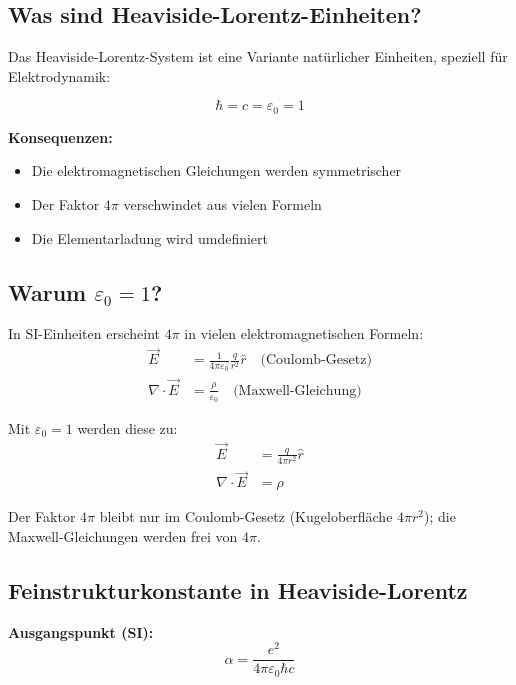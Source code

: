 	\subsection{Was sind Heaviside-Lorentz-Einheiten?}
	
	Das Heaviside-Lorentz-System ist eine Variante natürlicher Einheiten, speziell für Elektrodynamik:
	
	\begin{equation}
		\boxed{\hbar = c = \varepsilon_0 = 1}
	\end{equation}
	
	\textbf{Konsequenzen:}
	\begin{itemize}
		\item Die elektromagnetischen Gleichungen werden symmetrischer
		\item Der Faktor $4\pi$ verschwindet aus vielen Formeln
		\item Die Elementarladung wird umdefiniert
	\end{itemize}
	
	\subsection[Warum epsilon 0 = 1]{Warum $\varepsilon_0 = 1$?}
	
	In SI-Einheiten erscheint $4\pi$ in vielen elektromagnetischen Formeln:
	\begin{align}
		\vec{E} &= \frac{1}{4\pi\varepsilon_0} \frac{q}{r^2} \hat{r} \quad \text{(Coulomb-Gesetz)} \\
		\nabla \cdot \vec{E} &= \frac{\rho}{\varepsilon_0} \quad \text{(Maxwell-Gleichung)}
	\end{align}
	
	Mit $\varepsilon_0 = 1$ werden diese zu:
	\begin{align}
		\vec{E} &= \frac{q}{4\pi r^2} \hat{r} \\
		\nabla \cdot \vec{E} &= \rho
	\end{align}
	
	Der Faktor $4\pi$ bleibt nur im Coulomb-Gesetz (Kugeloberfläche $4\pi r^2$); die Maxwell-Gleichungen werden frei von $4\pi$.
	
	\subsection{Feinstrukturkonstante in Heaviside-Lorentz}
	
	\textbf{Ausgangspunkt (SI):}
	\begin{equation}
		\alpha = \frac{e^2}{4\pi\varepsilon_0\hbar c}
	\end{equation}
	
